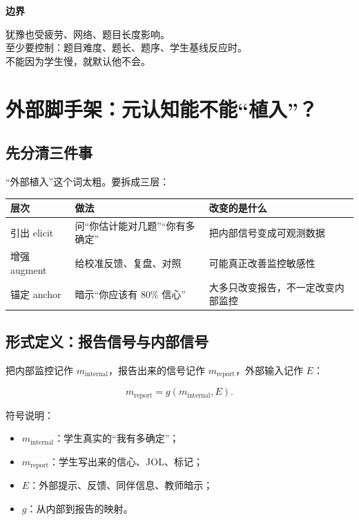 \documentclass[UTF8,a4paper,11pt]{ctexart}
\newenvironment{explainbox}[1]
{\begin{center}\begin{minipage}{0.94\textwidth}\colorbox{boxbg}{\parbox{0.92\textwidth}{\textbf{#1}\par\vspace{2pt}}}}
{\end{minipage}\end{center}}
\begin{document}
\begin{explainbox}{边界}
犹豫也受疲劳、网络、题目长度影响。\\
至少要控制：题目难度、题长、题序、学生基线反应时。\\
不能因为学生慢，就默认他不会。
\end{explainbox}

\newpage


\section{外部脚手架：元认知能不能“植入”？}

\subsection{先分清三件事}

“外部植入”这个词太粗。要拆成三层：

\begin{center}
\begin{longtable}{@{}p{2.8cm}p{4.4cm}p{6.8cm}@{}}
\toprule
\textbf{层次} & \textbf{做法} & \textbf{改变的是什么} \\
\midrule
引出 elicit & 问“你估计能对几题”“你有多确定” & 把内部信号变成可观测数据 \\
增强 augment & 给校准反馈、复盘、对照 & 可能真正改善监控敏感性 \\
锚定 anchor & 暗示“你应该有 80\% 信心” & 大多只改变报告，不一定改变内部监控 \\
\bottomrule
\end{longtable}
\end{center}

\subsection{形式定义：报告信号与内部信号}

把内部监控记作 $m_{\text{internal}}$，报告出来的信号记作 $m_{\text{report}}$，外部输入记作 $E$：

\begin{equation}
m_{\text{report}}=g(m_{\text{internal}},E).
\end{equation}

符号说明：

\begin{itemize}[leftmargin=2em]
\item $m_{\text{internal}}$：学生真实的“我有多确定”；
\item $m_{\text{report}}$：学生写出来的信心、JOL、标记；
\item $E$：外部提示、反馈、同伴信息、教师暗示；
\item $g$：从内部到报告的映射。
\end{itemize}
\end{document}
